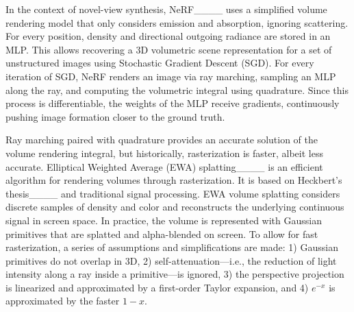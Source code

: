 In the context of novel-view synthesis, NeRF____ uses a simplified volume rendering model that only considers emission and absorption, ignoring scattering. %
For every position, density and directional outgoing radiance are stored in an MLP. This allows recovering
a 3D volumetric scene representation for a set of unstructured images using Stochastic Gradient Descent (SGD). For every iteration of SGD, NeRF renders an image via ray marching, sampling an MLP along the ray, and computing the volumetric integral using quadrature. 
Since this process is differentiable, the weights of the MLP receive gradients, continuously pushing image formation closer to the ground truth. 

Ray marching paired with quadrature provides an accurate solution of the volume rendering integral, but historically, rasterization is faster, albeit less accurate. Elliptical Weighted Average (EWA) splatting____ is an efficient algorithm for rendering volumes through rasterization. It is based on Heckbert's thesis____ and traditional signal processing. EWA volume splatting considers discrete samples of density and color and reconstructs the underlying continuous signal in screen space. In practice, the volume is represented with Gaussian primitives that are splatted and alpha-blended on screen. To allow for fast rasterization, a series of assumptions and simplifications are made: 1) Gaussian primitives do not overlap in 3D, 2) self-attenuation---i.e., the reduction of light intensity along a ray inside a primitive---is ignored, 3) the perspective projection is linearized and approximated by a first-order Taylor expansion, and 4) $e^{-x}$ is approximated by the faster $1-x$.

